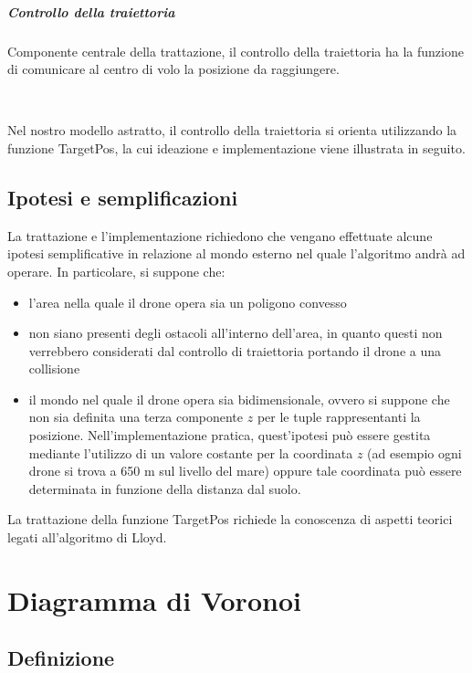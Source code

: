 \documentclass[11pt,a4paper]{report}
\newcommand{\name}[1]{{\ttfamily #1}}
\begin{document}
\paragraph{Controllo della traiettoria}

Componente centrale della trattazione, il controllo della traiettoria ha la funzione di comunicare al centro di volo la posizione da raggiungere.

\

Nel nostro modello astratto, il controllo della traiettoria si orienta utilizzando la funzione \name{TargetPos}, la cui ideazione e implementazione viene illustrata in seguito.

\section{Ipotesi e semplificazioni}

La trattazione e l'implementazione richiedono che vengano effettuate alcune ipotesi semplificative in relazione al mondo esterno nel quale l'algoritmo andrà ad operare. In particolare, si suppone che:

\begin{itemize}
	\item l'area nella quale il drone opera sia un poligono convesso
	\item non siano presenti degli ostacoli all'interno dell'area, in quanto questi non verrebbero considerati dal controllo di traiettoria portando il drone a una collisione
	\item il mondo nel quale il drone opera sia bidimensionale, ovvero si suppone che non sia definita una terza componente $z$ per le tuple rappresentanti la posizione. Nell'implementazione pratica, quest'ipotesi può essere gestita mediante l'utilizzo di un valore costante per la coordinata $z$ (ad esempio ogni drone si trova a 650 m sul livello del mare) oppure tale coordinata può essere determinata in funzione della distanza dal suolo.
\end{itemize}

La trattazione della funzione \name{TargetPos} richiede la conoscenza di aspetti teorici legati all'algoritmo di Lloyd.

\chapter{Diagramma di Voronoi}

\section{Definizione}
\end{document}
